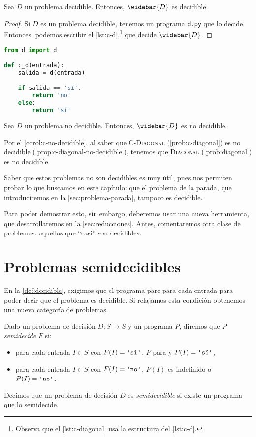 \begin{proposicion}\label{prop:c-decidible}
Sea $D$ un problema decidible. Entonces, $\widebar{D}$ es decidible.
\end{proposicion}
\begin{proof}
Si $D$ es un problema decidible, tenemos un programa \texttt{d.py} que lo decide. Entonces, podemos escribir el \cref{lst:c-d},\footnote{Observa que el \cref{lst:c-diagonal} usa la estructura del \cref{lst:c-d}.} que decide $\widebar{D}$.
\end{proof}
\begin{lstlisting}[language=Python, caption=\lstinline{c_d.py},label={lst:c-d}]
from d import d

def c_d(entrada):
    salida = d(entrada)

    if salida == 'sí':
        return 'no'
    else:
        return 'sí'
\end{lstlisting}
\begin{corolario}\label{corol:c-no-decidible}
Sea $D$ un problema no decidible. Entonces, $\widebar{D}$ es no decidible.
\end{corolario}
Por el \cref{corol:c-no-decidible}, al saber que \textsc{C-Diagonal} (\cref{prob:c-diagonal}) es no decidible (\cref{prop:c-diagonal-no-decidible}), tenemos que \textsc{Diagonal} (\cref{prob:diagonal}) es no decidible.\label{lab:diagonal-no-decidible}

Saber que estos problemas no son decidibles es muy útil, pues nos permiten probar lo que buscamos en este capítulo: que el problema de la parada, que introduciremos en la \cref{sec:problema-parada}, tampoco es decidible.

Para poder demostrar esto, sin embargo, deberemos usar una nueva herramienta, que desarrollaremos en la \cref{sec:reducciones}. Antes, comentaremos otra clase de problemas: aquellos que ``casi'' son decidibles.

\section{Problemas semidecidibles}\label{sec:problemas-semidecidibles}

En la \cref{def:decidible}, exigimos que el programa pare para cada entrada para poder decir que el problema es decidible. Si relajamos esta condición obtenemos una nueva categoría de problemas.

\begin{definicion}[Semidecidir]\label{def:semidecidible}
Dado un problema de decisión $D : S \longrightarrow S$ y un programa $P$, diremos que $P$ \emph{semidecide} $F$ si:
\begin{itemize}
    \item para cada entrada $I\in S$ con $F(I)=\palabra{sí}$, $P$ para y $P(I)=\palabra{sí}$,
    \item para cada entrada $I \in S$ con $F(I)=\palabra{no}$, $P(I)$ es indefinido o $P(I)=\palabra{no}$.
\end{itemize}

Decimos que un problema de decisión $D$ es \emph{semidecidible} si existe un programa que lo semidecide.
\end{definicion}


